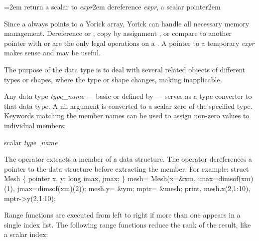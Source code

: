 \keyindent=2em
       {return a scalar  to {\it expr}\hglue2em}
       {dereference {\it expr}, a scalar pointer\hglue2em}
\endindentedkeys

Since a  always points to a Yorick array, Yorick can
handle all necessary memory management.  Dereference \kbd{*} or
\kbd{->}, copy by assignment \kbd{=}, or compare to another pointer
with \kbd{==} or \kbd{!=} are the only legal operations on a .
A pointer to a temporary {\it expr} makes sense and may be useful.

The purpose of the  data type is to deal with several related
objects of different types or shapes, where the type or shape changes,
making  inapplicable.


Any data type {\it type\_name} --- basic or defined by 
--- serves as a type converter to that data type.  A nil argument is
converted to a scalar zero of the specified type.  Keywords matching
the member names can be used to assign non-zero values to individual
members:

     {scalar {\it type\_name}}

The  operator extracts a member of a data structure.  The
\kbd{->} operator dereferences a pointer to the data structure before
extracting the member.  For example:
\beginexample
struct Mesh \{ pointer x, y; long imax, jmax; \}
mesh= Mesh(x=\&xm,
           imax=dimsof(xm)(1), jmax=dimsof(xm)(2));
mesh.y= \&ym;        mptr= \&mesh;
print, mesh.x(2,1:10), mptr->y(2,1:10);
\endexample


Range functions are executed from left to right if more than one
appears in a single index list.  The following range functions reduce
the rank of the result, like a scalar index:

\beginindentedkeys
{}
\endindentedkeys

